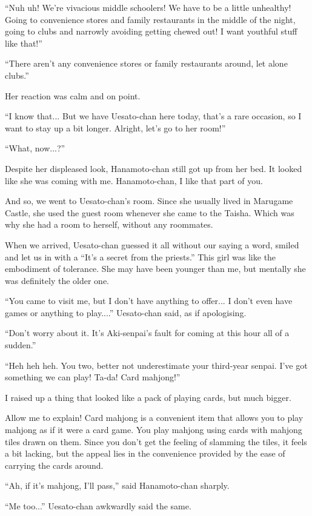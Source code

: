 ``Nuh uh! We're vivacious middle schoolers! We have to be a little unhealthy! Going to convenience stores and family restaurants in the middle of the night, going to clubs and narrowly avoiding getting chewed out! I want youthful stuff like that!''

``There aren't any convenience stores or family restaurants around, let alone clubs.''

Her reaction was calm and on point.

``I know that... But we have Uesato-chan here today, that's a rare occasion, so I want to stay up a bit longer. Alright, let's go to her room!''

``What, now...?''

Despite her displeased look, Hanamoto-chan still got up from her bed. It looked like she was coming with me. Hanamoto-chan, I like that part of you.

And so, we went to Uesato-chan's room. Since she usually lived in Marugame Castle, she used the guest room whenever she came to the Taisha. Which was why she had a room to herself, without any roommates.

When we arrived, Uesato-chan guessed it all without our saying a word, smiled and let us in with a ``It's a secret from the priests.'' This girl was like the embodiment of tolerance. She may have been younger than me, but mentally she was definitely the older one.

``You came to visit me, but I don't have anything to offer... I don't even have games or anything to play....'' Uesato-chan said, as if apologising.

``Don't worry about it. It's Aki-senpai's fault for coming at this hour all of a sudden.''

``Heh heh heh. You two, better not underestimate your third-year senpai. I've got something we can play! Ta-da! Card mahjong!''

I raised up a thing that looked like a pack of playing cards, but much bigger.

Allow me to explain! Card mahjong is a convenient item that allows you to play mahjong as if it were a card game. You play mahjong using cards with mahjong tiles drawn on them. Since you don't get the feeling of slamming the tiles, it feels a bit lacking, but the appeal lies in the convenience provided by the ease of carrying the cards around.

``Ah, if it's mahjong, I'll pass,'' said Hanamoto-chan sharply.

``Me too...'' Uesato-chan awkwardly said the same.

